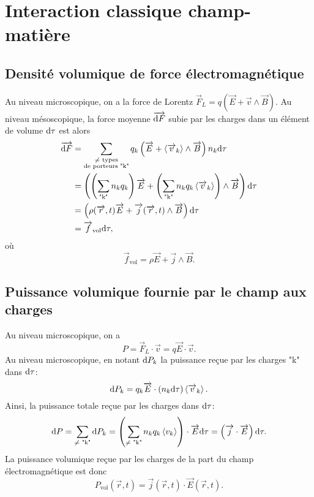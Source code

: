 \section{Interaction classique champ-matière}

\subsection{Densité volumique de force électromagnétique}

Au niveau microscopique, on a la force de Lorentz $\vec{F}_{L}=q\left(\vec{E}+\vec{v}\wedge\vec{B}\right)$. Au niveau mésoscopique, la force moyenne $\protect\overrightarrow{{\mathrm{d} F}}$ subie par les charges dans un élément de volume $\mathrm{d}\tau$ est alors
\begin{align}
    \protect\overrightarrow{{\mathrm{d} F}}
    &=
    \sum_{\substack{\neq\text{ types}\\\text{de porteurs "k"}}}q_k\left(\protect\overrightarrow{{E}}+\left\langle \protect\overrightarrow{{v}}_k\right\rangle\wedge\protect\overrightarrow{{B}}\right)n_k\mathrm{d}\tau\\
    &=
    \left(\left(\sum_{\text{"k"}}n_k q_k\right)\protect\overrightarrow{{E}}+\left(\sum_{\text{"k"}}n_k q_k \left\langle\protect\overrightarrow{{v}}_k\right\rangle\right)\wedge\protect\overrightarrow{{B}}\right)\mathrm{d}\tau\\
    &=
    \left(\rho(\protect\overrightarrow{{r}},t)\protect\overrightarrow{{E}}+\protect\overrightarrow{{j}}(\protect\overrightarrow{{r}},t)\wedge\protect\overrightarrow{{B}}\right)\mathrm{d}\tau\\
    &=
    \protect\overrightarrow{{f}}_{\mathrm{vol}}\mathrm{d}\tau,
\end{align}
où
\begin{equation}
    \boxed{
        \vec{f}_{\mathrm{vol}}=\rho\vec{E}+\vec{j}\wedge\vec{B}.
    }
\end{equation}

\subsection[Puissance volumique]{Puissance volumique fournie par le champ aux charges}

Au niveau microscopique, on a 
\begin{equation}
    P=\vec{F}_L\cdot\vec{v}=q\vec{E}\cdot\vec{v}.
\end{equation}
Au niveau microscopique, en notant $\mathrm{d} P_k$ la puissance reçue par les charges "k" dans $\mathrm{d}\tau$:
\begin{equation}
    \mathrm{d} P_k=
    q_k\protect\overrightarrow{{E}}\cdot\left(n_k\mathrm{d}\tau\right)\left\langle \protect\overrightarrow{{v}}_k\right\rangle.
\end{equation}
Ainsi, la puissance totale reçue par les charges dans $\mathrm{d}\tau$:
\begin{equation}
    \mathrm{d} P
    =
    \sum_{\neq \text{ "k"}}\mathrm{d} P_k
    =
    \left(\sum_{\neq \text{ "k"}}n_k q_k\left\langle v_k\right\rangle\right)\cdot\protect\overrightarrow{{E}}\mathrm{d}\tau=\left(\protect\overrightarrow{{j}}\cdot\protect\overrightarrow{{E}}\right)\mathrm{d}\tau.
\end{equation}
La puissance volumique reçue par les charges de la part du champ électromagnétique est donc
\begin{equation}
    \boxed{
        P_{\mathrm{vol}}(\vec{r},t)=\vec{j}(\vec{r},t)\cdot\vec{E}(\vec{r},t).
    }
\end{equation}

